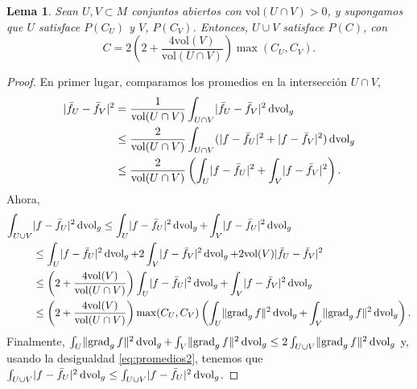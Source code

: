 \documentclass[11pt,a4paper]{amsbook}
\newtheorem{lemma}[subsection]{Lema}
\theoremstyle{remark} \newtheorem{rmk}[subsection]{Observación}
\theoremstyle{definition} \newtheorem{defn}[subsection]{Definición}
\theoremstyle{definition} \newtheorem{ex}[subsection]{Ejemplo}
\theoremstyle{definition} \newtheorem{ej}[subsection]{Ejercicio}
\begin{document}
\begin{lemma}
  Sean $U,V\subset M$ conjuntos abiertos con $\mathrm{vol}(U\cap V)>0$, y supongamos que $U$ satisface $P(C_U)$ y $V$, $P(C_V)$. Entonces, $U\cup V$ satisface $P(C)$, con
  \begin{equation*}
C= 2 \left( 2 + \frac{4\mathrm{vol}(V)}{\mathrm{vol}(U\cap V)} \right) \max(C_U,C_V).
  \end{equation*}
\end{lemma}

\begin{proof}
  En primer lugar, comparamos los promedios en la intersección $U\cap V$,
  \begin{align*}
    \lvert \bar{f}_U - \bar{f}_V \rvert^2 &= \frac{1}{\mathrm{vol}(U\cap V)} \int_{U\cap V} \lvert \bar{f}_U - \bar{f}_V \rvert^2 \operatorname{dvol}_g \\ & \leq \frac{2}{\mathrm{vol}(U\cap V)} \int_{U\cap V} (\lvert f- \bar{f}_U\rvert^2 + \lvert f - \bar{f}_V \rvert^2) \operatorname{dvol}_g \\
    & \leq \frac{2}{\mathrm{vol}(U\cap V)}\left(\int_{U} \lvert f- \bar{f}_U\rvert^2 + \int_V\lvert f- \bar{f}_V\rvert^2 \right).
  \end{align*}
  Ahora,
  \begin{align*}
    \int_{U\cup V} &\lvert f - \bar{f}_U \rvert^2 \operatorname{dvol}_g \leq \int_{U} \lvert f - \bar{f}_U \rvert^2 \operatorname{dvol}_g + \int_{V} \lvert f - \bar{f}_U \rvert^2 \operatorname{dvol}_g \\
    & \leq \int_{U} \lvert f - \bar{f}_U \rvert^2 \operatorname{dvol}_g + 2 \int_{V} \lvert f - \bar{f}_V \rvert^2 \operatorname{dvol}_g + 2\mathrm{vol}(V)     \lvert \bar{f}_U - \bar{f}_V \rvert^2 \\
                                         & \leq \left( 2 + \frac{4\mathrm{vol}(V)}{\mathrm{vol}(U\cap V)} \right)\int_{U} \lvert f - \bar{f}_U \rvert^2 \operatorname{dvol}_g + \int_{V} \lvert f - \bar{f}_V \rvert^2 \operatorname{dvol}_g\\
    & \leq \left( 2 + \frac{4\mathrm{vol}(V)}{\mathrm{vol}(U\cap V)} \right) \max(C_U,C_V) \left( \int_U \lVert \operatorname{grad}_g f \rVert^2 \operatorname{dvol}_g +  \int_V \lVert \operatorname{grad}_g f \rVert^2 \operatorname{dvol}_g\right).
  \end{align*}
Finalmente, $\int_U \lVert \operatorname{grad}_g f \rVert^2 \operatorname{dvol}_g +  \int_V \lVert \operatorname{grad}_g f \rVert^2 \operatorname{dvol}_g \leq 2\int_{U\cup V} \lVert \operatorname{grad}_g f \rVert^2 \operatorname{dvol}_g$ y, usando la desigualdad \eqref{eq:promedios2}, tenemos que $\int_{U\cup V} \lvert f - \bar{f}_U \rvert^2 \operatorname{dvol}_g \leq \int_{U\cup V} \lvert f - \bar{f}_U \rvert^2 \operatorname{dvol}_g$.
\end{proof}
\end{document}
